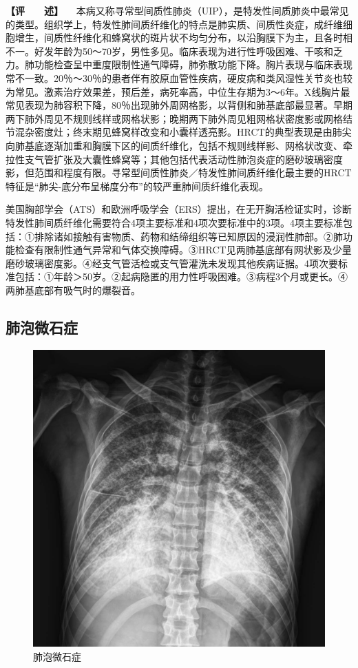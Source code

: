 \textbf{【评　　述】}
　本病又称寻常型间质性肺炎（UIP），是特发性间质肺炎中最常见的类型。组织学上，特发性肺间质纤维化的特点是肺实质、间质性炎症，成纤维细胞增生，间质性纤维化和蜂窝状的斑片状不均匀分布，以沿胸膜下为主，且各时相不一。好发年龄为50～70岁，男性多见。临床表现为进行性呼吸困难、干咳和乏力。肺功能检查呈中重度限制性通气障碍，肺弥散功能下降。胸片表现与临床表现常不一致。20％～30％的患者伴有胶原血管性疾病，硬皮病和类风湿性关节炎也较为常见。激素治疗效果差，预后差，病死率高，中位生存期为3～6年。X线胸片最常见表现为肺容积下降，80％出现肺外周网格影，以背侧和肺基底部最显著。早期两下肺外周见不规则线样或网格状影；晚期两下肺外周见粗网格状密度影或网格结节混杂密度灶；终末期见蜂窝样改变和小囊样透亮影。HRCT的典型表现是由肺尖向肺基底逐渐加重和胸膜下区的间质纤维化，包括不规则线样影、网格状改变、牵拉性支气管扩张及大囊性蜂窝等；其他包括代表活动性肺泡炎症的磨砂玻璃密度影，但范围和程度有限。寻常型间质性肺炎／特发性肺间质纤维化最主要的HRCT特征是“肺尖-底分布呈梯度分布”的较严重肺间质纤维化表现。

美国胸部学会（ATS）和欧洲呼吸学会（ERS）提出，在无开胸活检证实时，诊断特发性肺间质纤维化需要符合4项主要标准和4项次要标准中的3项。4项主要标准包括：①排除诸如接触有害物质、药物和结缔组织等已知原因的浸润性肺部。②肺功能检查有限制性通气异常和气体交换障碍。③HRCT见两肺基底部有网状影及少量磨砂玻璃密度影。④经支气管活检或支气管灌洗未发现其他疾病证据。4项次要标准包括：①年龄＞50岁。②起病隐匿的用力性呼吸困难。③病程3个月或更长。④两肺基底部有吸气时的爆裂音。

\subsection{肺泡微石症}

\begin{figure}[!htbp]
 \centering
 \includegraphics{./images/Image00182.jpg}
 \captionsetup{justification=centering}
 \caption{肺泡微石症}
 \label{fig3-10-3}
  \end{figure} 

